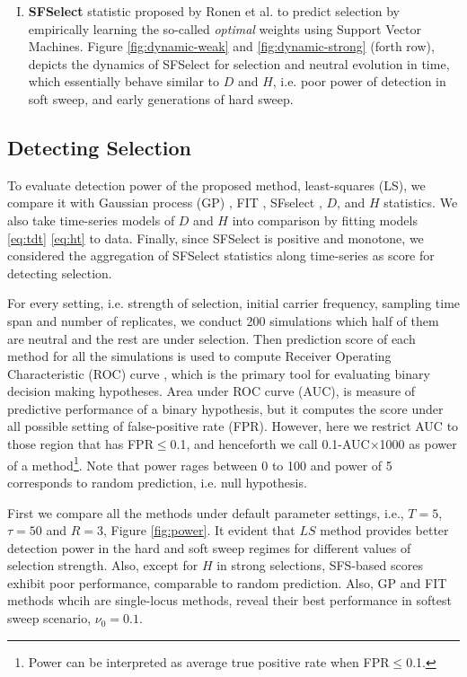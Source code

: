 \documentclass[11pt]{article}
\begin{document}
\begin{enumerate}[I.]
	\item {\bf SFSelect} statistic proposed by Ronen et 
	al. \cite{ronen2013learning} to predict selection by empirically learning 
	the so-called \emph{optimal} weights using Support Vector Machines. 
	Figure \ref{fig:dynamic-weak} and \ref{fig:dynamic-strong} (forth
	row), depicts the dynamics of SFSelect for selection and neutral evolution 
	in time, which essentially behave similar to $D$ and $H$, i.e. poor power 
	of detection in soft sweep, and early generations of hard sweep.
\end{enumerate}




\subsection{Detecting Selection}
To evaluate detection power of the proposed method, least-squares (LS), we 
compare it with Gaussian process (GP) \cite{Terhorst2015Multi}, FIT 
\cite{feder2014Identifying},  SFselect \cite{ronen2015predicting}, 
$D$\cite{tajima1989statistical}, and $H$ \cite{fay2000hitchhiking} statistics. 
We also take time-series models of $D$ and $H$ into comparison by fitting 
models \eqref{eq:tdt} \eqref{eq:ht} to data. Finally, since SFSelect is 
positive and 
monotone, we considered the aggregation of SFSelect statistics 
along time-series as score for detecting selection.

For every setting, i.e. strength of selection, initial carrier frequency, 
sampling time span and number of replicates, we conduct 200 simulations which 
half of them are neutral and the rest are under selection. Then prediction 
score of each method for all the simulations is used to compute Receiver 
Operating Characteristic (ROC) curve \cite{fawcett2006introduction}, which is 
the primary tool for evaluating binary decision making hypotheses.
Area under ROC  curve (AUC), is measure of predictive performance of a binary 
hypothesis, but it computes the score under all possible setting of 
false-positive rate (FPR). However, here we restrict AUC 
\cite{mcclish1989analyzing} to those region that has FPR$\le$0.1, and 
henceforth we call 0.1-AUC$\times$1000 as power of a method\footnote{Power can 
be interpreted as average true positive rate when FPR$\le$0.1.}. Note that 
power 
rages between 0 to 100 and power of 5 corresponds to random prediction, i.e. 
null hypothesis.

First we compare all the methods under default parameter settings, i.e., 
$T=5$, $\tau=50$ and $R=3$, Figure \ref{fig:power}. It evident that $LS$ method 
provides better detection power in the hard and soft sweep regimes for 
different values of selection strength. Also, except for $H$ in strong 
selections, SFS-based scores exhibit poor performance, comparable to random 
prediction. Also, GP and FIT methods whcih are single-locus methods, reveal 
their best performance in softest sweep scenario, $\nu_0=0.1$.
\end{document}
